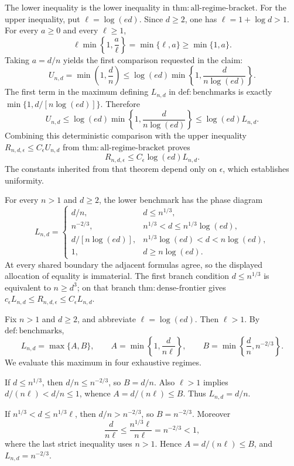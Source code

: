 The lower inequality is the lower inequality in \(\mathrm{thm:all\mbox{-}regime\mbox{-}bracket}\).  For the upper inequality, put \(\ell=\log(ed)\).  Since \(d\geq2\), one has \(\ell=1+\log d>1\).  For every \(a\geq0\) and every \(\ell\geq1\),
\[
 \ell\min\!\left\{1,\frac a\ell\right\}=\min\{\ell,a\}\geq\min\{1,a\}.
\]
Taking \(a=d/n\) yields the first comparison requested in the claim:
\[
 U_{n,d}=\min\!\left(1,\frac dn\right)
 \leq \log(ed)\min\!\left\{1,\frac{d}{n\log(ed)}\right\}.
\]
The first term in the maximum defining \(L_{n,d}\) in \(\mathrm{def:benchmarks}\) is exactly \(\min\{1,d/[n\log(ed)]\}\).  Therefore
\[
 U_{n,d}
 \leq \log(ed)\min\!\left\{1,\frac{d}{n\log(ed)}\right\}
 \leq \log(ed)L_{n,d}.
\]
Combining this deterministic comparison with the upper inequality \(R_{n,d,\epsilon}\leq C_\epsilon U_{n,d}\) from \(\mathrm{thm:all\mbox{-}regime\mbox{-}bracket}\) proves
\[
 R_{n,d,\epsilon}\leq C_\epsilon\log(ed)L_{n,d}.
\]
The constants inherited from that theorem depend only on \(\epsilon\), which establishes uniformity.

For every \(n>1\) and \(d\geq2\), the lower benchmark has the phase diagram
\[
L_{n,d}=
\begin{cases}
 d/n,
   & d\leq n^{1/3},\\
 n^{-2/3},
   & n^{1/3}<d\leq n^{1/3}\log(ed),\\
 d/[n\log(ed)],
   & n^{1/3}\log(ed)<d<n\log(ed),\\
 1,
   & d\geq n\log(ed).
\end{cases}
\]
At every shared boundary the adjacent formulas agree, so the displayed allocation of equality is immaterial.  The first branch condition \(d\leq n^{1/3}\) is equivalent to \(n\geq d^3\); on that branch \(\mathrm{thm:dense\mbox{-}frontier}\) gives \(c_\epsilon L_{n,d}\leq R_{n,d,\epsilon}\leq C_\epsilon L_{n,d}\).

Fix \(n>1\) and \(d\geq2\), and abbreviate \(\ell=\log(ed)\).  Then \(\ell>1\).  By \(\mathrm{def:benchmarks}\),
\[
 L_{n,d}=\max\{A,B\},\qquad
 A=\min\!\left\{1,\frac{d}{n\ell}\right\},\qquad
 B=\min\!\left\{\frac dn,n^{-2/3}\right\}.
\]
We evaluate this maximum in four exhaustive regimes.

If \(d\leq n^{1/3}\), then \(d/n\leq n^{-2/3}\), so \(B=d/n\).  Also \(\ell>1\) implies \(d/(n\ell)<d/n\leq1\), whence \(A=d/(n\ell)\leq B\).  Thus \(L_{n,d}=d/n\).

If \(n^{1/3}<d\leq n^{1/3}\ell\), then \(d/n>n^{-2/3}\), so \(B=n^{-2/3}\).  Moreover
\[
 \frac{d}{n\ell}\leq\frac{n^{1/3}\ell}{n\ell}=n^{-2/3}<1,
\]
where the last strict inequality uses \(n>1\).  Hence \(A=d/(n\ell)\leq B\), and \(L_{n,d}=n^{-2/3}\).

